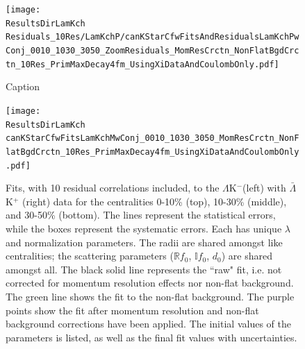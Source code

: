 \documentclass[../AnalysisNoteJBuxton.tex]{subfiles}
\begin{document}
\begin{figure}[h]
  \centering
  \texttt{[image: \\ResultsDirLamKch Residuals\_10Res/LamKchP/canKStarCfwFitsAndResidualsLamKchPwConj\_0010\_1030\_3050\_ZoomResiduals\_MomResCrctn\_NonFlatBgdCrctn\_10Res\_PrimMaxDecay4fm\_UsingXiDataAndCoulombOnly.pdf]}
  \caption[Small Caption]{Caption}
  \label{fig:LamKchPwConjFitsAndResiduals_10Res}
\end{figure}


\begin{figure}[h]
  \centering
  \texttt{[image: \\ResultsDirLamKch canKStarCfwFitsLamKchMwConj\_0010\_1030\_3050\_MomResCrctn\_NonFlatBgdCrctn\_10Res\_PrimMaxDecay4fm\_UsingXiDataAndCoulombOnly.pdf]}
  \caption[$\Lambda$K$^{-}$($\bar{\Lambda}$K$^{+}$) Fits with 10 Residuals]{Fits, with 10 residual correlations included, to the $\Lambda$K$^{-}$(left) with $\bar{\Lambda}$K$^{+}$ (right) data for the centralities 0-10\% (top), 10-30\% (middle), and 30-50\% (bottom).
The lines represent the statistical errors, while the boxes represent the systematic errors.  
Each has unique $\lambda$ and normalization parameters.
The radii are shared amongst like centralities; the scattering parameters ($\mathbb{R}f_{0}$, $\mathbb{I}f_{0}$, $d_{0}$) are shared amongst all.
The black solid line represents the ``raw" fit, i.e. not corrected for momentum resolution effects nor non-flat background.  
The green line shows the fit to the non-flat background.
The purple points show the fit after momentum resolution and non-flat background corrections have been applied.
The initial values of the parameters is listed, as well as the final fit values with uncertainties.}
  \label{fig:LamKchMwConjFits_10Res}
\end{figure}
\end{document}
